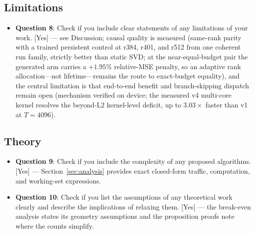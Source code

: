 \subsection*{Limitations}
\begin{itemize}
  \item \textbf{Question 8}: Check if you include clear statements of any
  limitations of your work.
  [Yes] — see Discussion; causal quality is measured (same-rank parity with a
  trained persistent control at r384, r401, and r512 from one coherent run
  family, strictly better than static SVD; at the near-equal-budget pair the
  generated arm carries a $+1.95\%$ relative-MSE penalty, so an adaptive rank
  allocation—not lifetime—remains the route to exact-budget equality), and the
  central limitation is that end-to-end benefit and branch-skipping dispatch
  remain open (mechanism verified on device; the measured v4 multi-core
  kernel resolves the beyond-L2 kernel-level deficit, up to $3.03\times$
  faster than v1 at $T{=}4096$).
\end{itemize}

\subsection*{Theory}
\begin{itemize}
  \item \textbf{Question 9}: Check if you include the complexity of any
  proposed algorithms.
  [Yes] — Section~\ref{sec:analysis} provides exact closed-form traffic,
  computation, and working-set expressions.
  \item \textbf{Question 10}: Check if you list the assumptions of any
  theoretical work clearly and describe the implications of relaxing them.
  [Yes] — the break-even analysis states its geometry assumptions and the
  proposition proofs note where the counts simplify.
\end{itemize}

